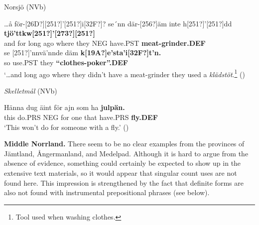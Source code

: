 
\item 

Norsjö (NVb)



 \ea\label{}
\gll …å  för-[26D?][251?]’[251?]i[32F?]?  se´nn  där-[256?]äm  inte  h[251?]’[251?]dd  \textbf{tjö’ttkw[251?]’[273?][251?]}\\


and  for long  ago  where they  NEG  have.PST  \textbf{meat-grinder.DEF}\\

 \ea\label{}
\gll se  [251?]’nnvä’nnde  däm  \textbf{k}\textbf{[19A?]}\textbf{e’sta’i[32F?]t’n.}\\


so  use.PST  they  \textbf{“clothes-poker”.DEF}\\

\glt ‘…and long ago where they didn’t have a meat-grinder they used a \textit{klädstöt}.\footnote{ Tool used when washing clothes.} (\citet[303]{Westerberg2004})

\z

\item 

\textit{Skelletmål} (NVb)



 \ea\label{}
\gll Hänna  dug  äint  för  ajn  som  ha  \textbf{julpän.} \\


this  do.PRS  NEG  for  one  that  have.PRS  \textbf{fly.DEF} \\

\glt ‘This won’t do for someone with a fly.’ (\citet[94]{Westerlund1978})

\z

\textbf{Middle Norrland.} There seem to be no clear examples from the provinces of Jämtland, Ångermanland, and Medelpad. Although it is hard to argue from the absence of evidence, something could certainly be expected to show up in the extensive text materials, so it would appear that singular count uses are not found here. This impression is strengthened by the fact that definite forms are also not found with instrumental prepositional phrases (see below). 

